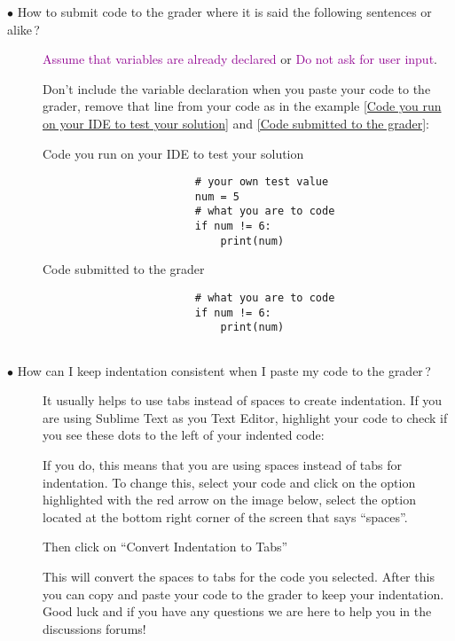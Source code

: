\documentclass{article}
\newcommand{\question}[1]{\item[$\bullet$ #1] \hfil}
\newenvironment{answer}{}{}
\newenvironment{faq}{\begin{description}}{\end{description}}
\begin{document}
\begin{faq}
				\question{How to submit code to the grader where it is said the following sentences or alike\,?}
				
				\textcolor[HTML]{900090}{Assume that variables are already declared} or \textcolor[HTML]{900090}{Do not ask for user input}.
				
				\begin{answer}
					Don't include the variable declaration when you paste your code to the
					grader, remove that line from your code as in the example \textcolor{blue}{\ref{Code you run on your IDE to test your solution}} and \textcolor{blue}{\ref{Code submitted to the grader}}:
					
					\begin{table}[htb]
						\caption{Code you run on your IDE to test your solution}
						\label{Code you run on your IDE to test your solution}
						\begin{verbatim}
						# your own test value
						num = 5
						# what you are to code
						if num != 6:
						    print(num)  
						\end{verbatim}
					\end{table}
					
					\begin{table}[htb]
						\caption{Code submitted to the grader}
						\label{Code submitted to the grader}
						\begin{verbatim}
						# what you are to code
						if num != 6:
						    print(num)
						
						\end{verbatim}
					\end{table}
				\end{answer}
				
				\question{How can I keep indentation consistent when I paste my code to the grader\,?}
				
				\begin{answer}
					It usually helps to use tabs instead of spaces to create indentation.
					If you are using Sublime Text as you Text Editor, highlight your code to check if you see
					these dots to the left of your indented code:
					
					
					
					If you do, this means that you are using spaces instead of tabs for
					indentation. To change this, select your code and click on the option highlighted with
					the red arrow on the image below, select the option located at the bottom right corner
					of the screen that says “spaces”.
					
					
					
					Then click on “Convert Indentation to Tabs”
					
					
					
					This will convert the spaces to tabs for the code you selected. After this you
					can copy and paste your code to the grader to keep your indentation. Good luck and
					if you have any questions we are here to help you in the discussions forums!
				\end{answer}
			\end{faq}
		
\end{document}
